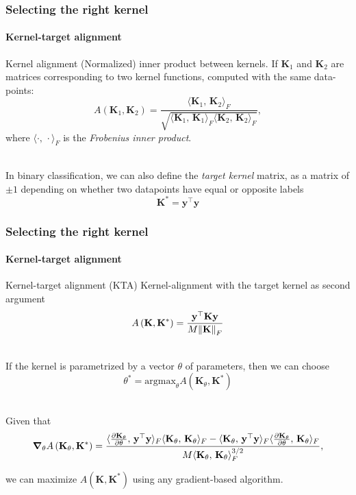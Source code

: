 \documentclass[aspectratio=43]{beamer}
\newcommand{\inner}[2]{\langle #1,\, #2\rangle}
\begin{document}
\begin{frame}
  \frametitle{Selecting the right kernel}
  \framesubtitle{Kernel-target alignment}

  \small
  \begin{exampleblock}{Kernel alignment}
    (Normalized) inner product between kernels. If $\mathbf{K}_1$ and $\mathbf{K}_2$ are matrices corresponding to two kernel functions, computed with the same data-points:
    \[A\left( \mathbf{K}_1, \mathbf{K}_2 \right) = \frac{\inner{\mathbf{K}_1}{\mathbf{K}_2}_F}{\sqrt{\inner{\mathbf{K}_1}{\mathbf{K}_1}_F \inner{\mathbf{K}_2}{\mathbf{K}_2}_F}},\]
    where $\inner{\cdot}{\cdot}_F$ is the \emph{Frobenius inner product}.
  \end{exampleblock}

  \ \\
  In binary classification, we can also define the \emph{target kernel} matrix, as a matrix of $\pm 1$ depending on whether two datapoints have equal or opposite labels
  \[\mathbf{K}^* = \mathbf{y}^\top \mathbf{y}\]

\end{frame}


\begin{frame}
  \frametitle{Selecting the right kernel}
  \framesubtitle{Kernel-target alignment}

  \small
  \begin{exampleblock}{Kernel-target alignment (KTA)}
    Kernel-alignment with the target kernel as second argument
    \[A\left( \mathbf{K}, \mathbf{K}^* \right) = \frac{\mathbf{y}^\top \mathbf{K} \mathbf{y}}{M \norm{\mathbf{K}}_F}\]
  \end{exampleblock}

  \ \\
  If the kernel is parametrized by a vector $\theta$ of parameters, then we can choose
  \[\theta^* = \mathrm{argmax}_\theta A\left( \mathbf{K}_\theta, \mathbf{K}^* \right)\]

  \ \\
  Given that
  \[\grad_\theta A\left( \mathbf{K}_\theta, \mathbf{K}^* \right) = \frac{\inner{\pdv{\mathbf{K}_\theta}{\theta}}{\mathbf{y}^\top \mathbf{y}}_F\inner{\mathbf{K}_\theta}{\mathbf{K}_\theta}_F - \inner{\mathbf{K}_\theta}{\mathbf{y}^\top \mathbf{y}}_F \inner{\pdv{\mathbf{K}_\theta}{\theta}}{\mathbf{K}_\theta}_F}{M\inner{\mathbf{K}_\theta}{\mathbf{K}_\theta}_F^{3/2}},\]

  we can maximize $A\left( \mathbf{K}, \mathbf{K}^* \right)$ using any gradient-based algorithm.
\end{frame}
\end{document}

